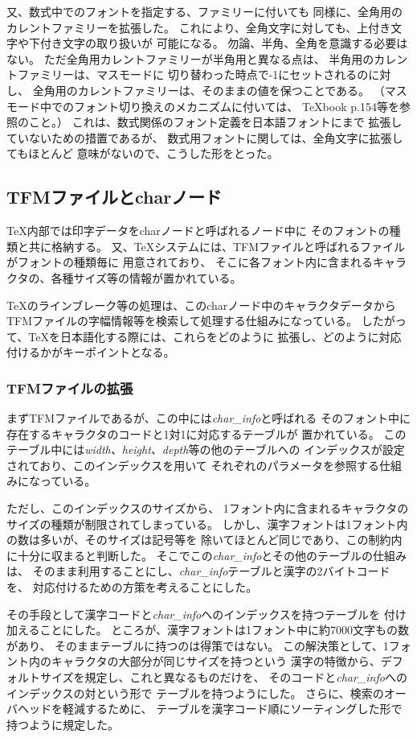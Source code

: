 又、数式中でのフォントを指定する、ファミリーに付いても
同様に、全角用のカレントファミリーを拡張した。
これにより、全角文字に対しても、上付き文字や下付き文字の取り扱いが
可能になる。
勿論、半角、全角を意識する必要はない。
ただ全角用カレントファミリーが半角用と異なる点は、
半角用のカレントファミリーは、マスモードに
切り替わった時点で-1にセットされるのに対し、
全角用のカレントファミリーは、そのままの値を保つことである。
（マスモード中でのフォント切り換えのメカニズムに付いては、
\TeX book p.154等を参照のこと。）
これは、数式関係のフォント定義を日本語フォントにまで
拡張していないための措置であるが、
数式用フォントに関しては、全角文字に拡張してもほとんど
意味がないので、こうした形をとった。
%
\subsection{TFMファイルとcharノード}
\TeX 内部では印字データをcharノードと呼ばれるノード中に
そのフォントの種類と共に格納する。
又、\TeX システムには、TFMファイルと呼ばれるファイルがフォントの種類毎に
用意されており、
そこに各フォント内に含まれるキャラクタの、各種サイズ等の情報が置かれている。

\TeX のラインブレーク等の処理は、このcharノード中のキャラクタデータから
TFMファイルの字幅情報等を検索して処理する仕組みになっている。
したがって、\TeX を日本語化する際には、これらをどのように
拡張し、どのように対応付けるかがキーポイントとなる。
%
\subsubsection{TFMファイルの拡張}
まずTFMファイルであるが、この中には{\it char\_info}と呼ばれる
そのフォント中に存在するキャラクタのコードと1対1に対応するテーブルが
置かれている。
このテーブル中には{\it width\/、height\/、depth}等の他のテーブルへの
インデックスが設定されており、このインデックスを用いて
それぞれのパラメータを参照する仕組みになっている。

ただし、このインデックスのサイズから、
1フォント内に含まれるキャラクタのサイズの種類が制限されてしまっている。
しかし、漢字フォントは1フォント内の数は多いが、そのサイズは記号等を
除いてほとんど同じであり、この制約内に十分に収まると判断した。
そこでこの{\it char\_info}とその他のテーブルの仕組みは、
そのまま利用することにし、{\it char\_info}テーブルと漢字の2バイトコードを、
対応付けるための方策を考えることにした。

その手段として漢字コードと{\it char\_info}へのインデックスを持つテーブルを
付け加えることにした。
ところが、漢字フォントは1フォント中に約7000文字もの数があり、
そのままテーブルに持つのは得策ではない。
この解決策として、1フォント内のキャラクタの大部分が同じサイズを持つという
漢字の特徴から、デフォルトサイズを規定し、これと異なるものだけを、
そのコードと{\it char\_info}へのインデックスの対という形で
テーブルを持つようにした。
さらに、検索のオーバヘッドを軽減するために、
テーブルを漢字コード順にソーティングした形で持つように規定した。

